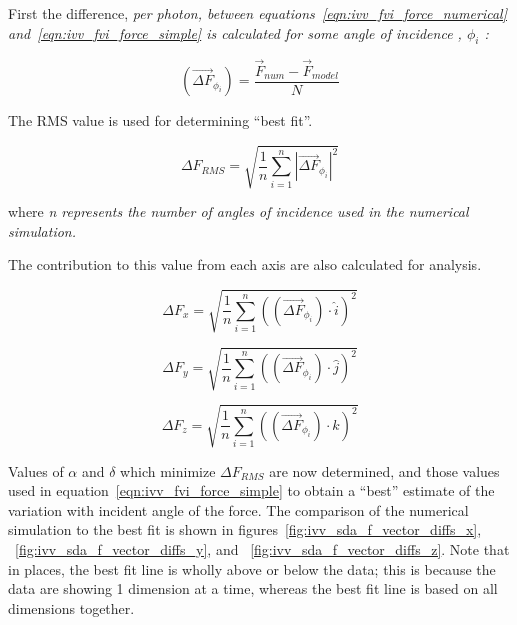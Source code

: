 \begin{description}
      First the difference, \it per photon, \rm between
      equations~\ref{eqn:ivv_fvi_force_numerical}
      and~\ref{eqn:ivv_fvi_force_simple}
      is calculated for some angle of incidence ,  $\phi _{i} $ :

      \begin{equation}
        (\vec{{\Delta F}}_{\phi _{i} })=
        \frac{{\vec{F}}_{\mathit{num}}-{\vec{F}}_{\mathit{model}}}{N}
      \end{equation}

      The RMS value is used for determining ``best fit''.

      \begin{equation}
        \Delta F_{\mathit{RMS}}=\sqrt{\frac{1}{n}\sum _{i=1}^{n}|\vec{{\Delta
        F}}_{\phi _{i}}|^{2}}
      \end{equation}

      where \it n \rm represents the number of angles of incidence
      used in the numerical simulation.

      The contribution to this value from each axis are
      also calculated for analysis.

      \begin{equation}
        \Delta F_{x}=\sqrt{\frac{1}{n}\sum _{i=1}^{n}\left((\vec{{\Delta
        F}}_{\phi _{i}})\cdot \hat{i}\right)^{2}}
      \end{equation}

      \begin{equation}
        \Delta F_{y}=\sqrt{\frac{1}{n}\sum _{i=1}^{n}\left((\vec{{\Delta
        F}}_{\phi _{i}})\cdot \hat{j}\right)^{2}}
      \end{equation}

      \begin{equation}
        \Delta F_{z}=\sqrt{\frac{1}{n}\sum _{i=1}^{n}\left((\vec{{\Delta
        F}}_{\phi _{i}})\cdot \hat{k}\right)^{2}}
      \end{equation}


      Values of $\alpha $ and  $\delta $ which minimize  $\Delta
      F_{\mathit{RMS}}$ are now determined, and those values used in
      equation~\ref{eqn:ivv_fvi_force_simple} to obtain a ``best'' estimate of
      the variation with incident
      angle of the force. The comparison of the numerical simulation to the
      best fit is shown in figures~\ref{fig:ivv_sda_f_vector_diffs_x},
     ~\ref{fig:ivv_sda_f_vector_diffs_y}, and
     ~\ref{fig:ivv_sda_f_vector_diffs_z}.
      Note that in places, the best
      fit line is wholly above or below the data; this is because the data are
      showing 1 dimension at a time, whereas the best fit line is based on
      all dimensions together.


\end{description}
